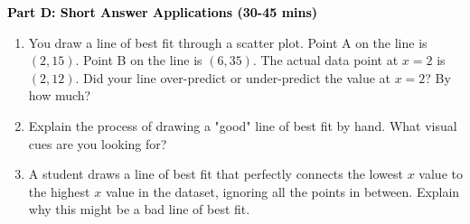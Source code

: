 \documentclass[12pt, letterpaper, fleqn]{article}
\begin{document}
\newpage

\begin{tcolorbox}[colback=customteal!20]
\large\textcolor{black}{\textbf{Part D: Short Answer Applications (30-45 mins)}}
\end{tcolorbox}

\vspace{3mm}

\begin{enumerate}[itemsep=4.2cm, leftmargin=0.6cm, resume]
\item You draw a line of best fit through a scatter plot. Point A on the line is $(2, 15)$. Point B on the line is $(6, 35)$. The actual data point at $x=2$ is $(2, 12)$. Did your line over-predict or under-predict the value at $x=2$? By how much?
\item Explain the process of drawing a "good" line of best fit by hand. What visual cues are you looking for?
\item A student draws a line of best fit that perfectly connects the lowest $x$ value to the highest $x$ value in the dataset, ignoring all the points in between. Explain why this might be a bad line of best fit.
\end{enumerate}
\end{document}
